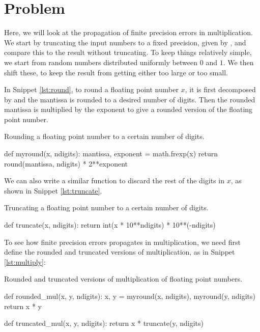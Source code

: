 \section{Problem \thesection}\label{sec:p1}

Here, we will look at the propagation of finite precision errors in
multiplication. We start by truncating the input numbers to a fixed precision, given by
, and compare this to the result without truncating. To keep things relatively simple,
we start from random numbers distributed uniformly between \(0\) and \(1\). We then shift these,
to keep the result from getting either too large or too small.

In Snippet \ref{lst:round}, to round a floating point number \(x\), it is first decomposed by
 and the mantissa is rounded to a desired number of digits. Then the
rounded mantissa is multiplied by the exponent to give a rounded version of the floating
point number.

\begin{algorithm}
    \caption{Rounding a floating point number to a certain number of digits.}
    \label{lst:round}
    \begin{pythoncode}
        def myround(x, ndigits):
            mantissa, exponent = math.frexp(x)
            return round(mantissa, ndigits) * 2**exponent
    \end{pythoncode}
\end{algorithm}

We can also write a similar  function to discard the rest of the digits
in \(x\), as shown in Snippet \ref{lst:truncate}.

\begin{algorithm}
    \caption{Truncating a floating point number to a certain number of digits.}
    \label{lst:truncate}
    \begin{pythoncode}
        def truncate(x, ndigits):
            return int(x * 10**ndigits) * 10**(-ndigits)
    \end{pythoncode}
\end{algorithm}

To see how finite precision errors propagates in multiplication, we need first define the
rounded and truncated versions of multiplication, as in Snippet \ref{lst:multiply}:

\begin{algorithm}
    \caption{Rounded and truncated versions of multiplication of floating point numbers.}
    \label{lst:multiply}
    \begin{pythoncode}
        def rounded_mul(x, y, ndigits):
            x, y = myround(x, ndigits), myround(y, ndigits)
            return x * y


        def truncated_mul(x, y, ndigits):
            return x * truncate(y, ndigits)
    \end{pythoncode}
\end{algorithm}

